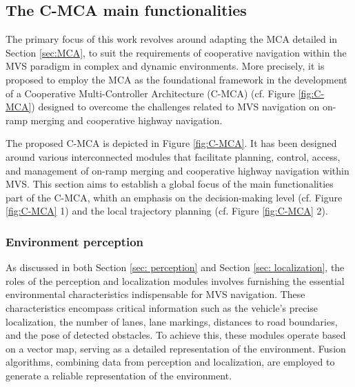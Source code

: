 \subsection{The C-MCA main functionalities}






The primary focus of this work revolves around adapting the MCA detailed in Section \ref{sec:MCA}, to suit the requirements of cooperative navigation within the MVS paradigm in complex and dynamic environments. More precisely, it is proposed to employ the MCA as the foundational framework in the development of a Cooperative Multi-Controller Architecture (C-MCA) (cf. Figure \ref{fig:C-MCA}) designed to overcome the challenges related to MVS navigation on on-ramp merging and cooperative highway navigation. 

The proposed C-MCA is depicted in Figure \ref{fig:C-MCA}. It has been designed around various interconnected modules that facilitate planning, control, access, and management of on-ramp merging and cooperative highway navigation within MVS. This section aims to establish a global focus of the main functionalities part of the C-MCA, whith an emphasis on the decision-making level (cf. Figure \ref{fig:C-MCA} \textcircled{\small{1}}) and the local trajectory planning (cf. Figure \ref{fig:C-MCA} \textcircled{\small{2}}).  























\subsubsection{Environment perception} \label{sec:environment_features}
As discussed in both Section \ref{sec: perception} and Section \ref{sec: localization}, the roles of the perception and localization modules involves furnishing the essential environmental characteristics indispensable for MVS navigation. These characteristics encompass critical information such as the vehicle's precise localization, the number of lanes, lane markings, distances to road boundaries, and the pose of detected obstacles. To achieve this, these modules operate based on a vector map, serving as a detailed representation of the environment. Fusion algorithms, combining data from perception and localization, are employed to generate a reliable representation of the environment. 



